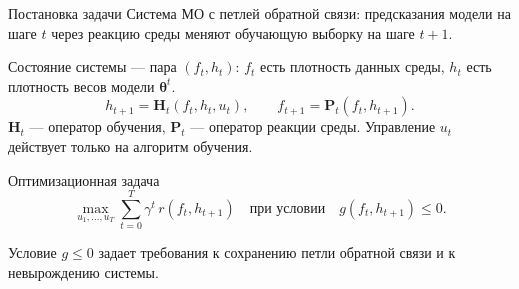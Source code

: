 \documentclass{beamer}
\newcommand{\bH}{\mathbf{H}}
\newcommand{\bP}{\mathbf{P}}
\newcommand{\btheta}{\boldsymbol{\theta}}
\begin{document}
\begin{frame}{Постановка задачи}
    Система МО с петлей обратной связи: предсказания модели на шаге $t$ через реакцию среды меняют обучающую выборку на шаге $t+1$.

    Состояние системы --- пара $(f_t, h_t)$: $f_t$ есть плотность данных среды, $h_t$ есть плотность весов модели $\btheta^t$.
    \[
        h_{t+1} = \bH_t(f_t, h_t, u_t), \qquad f_{t+1} = \bP_t(f_t, h_{t+1}).
    \]
    $\bH_t$ --- оператор обучения, $\bP_t$ --- оператор реакции среды. Управление $u_t$ действует только на алгоритм обучения.
    \begin{block}{Оптимизационная задача}
        \[
            \max_{u_1, \ldots, u_T} \sum_{t=0}^{T} \gamma^t\, r(f_t, h_{t+1})
            \quad \text{при условии} \quad g(f_t, h_{t+1}) \le 0.
        \]
    \end{block}
    Условие $g \le 0$ задает требования к сохранению петли обратной связи и к невырождению системы.
\end{frame}
\end{document}
